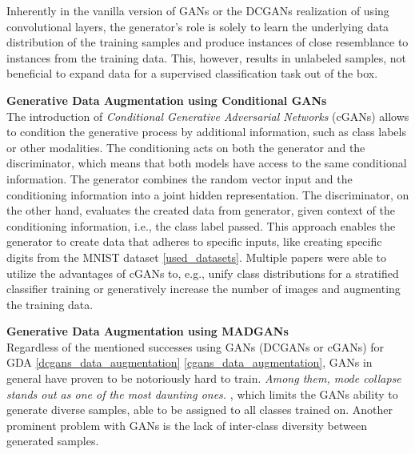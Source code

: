 Inherently in the vanilla version of GANs or the DCGANs realization of using convolutional layers, the generator's role is solely to learn the underlying data distribution of the training samples and produce instances of close resemblance to instances from the training data. This, however, results in unlabeled samples, not beneficial to expand data for a supervised classification task out of the box.

\noindent\textbf{Generative Data Augmentation using Conditional GANs}\label{cgans_data_augmentation} \\
The introduction of \textit{Conditional Generative Adversarial Networks} (cGANs) \cite{mirza2014conditionalgenerativeadversarialnets} allows to condition the generative process by additional information, such as class labels or other modalities. The conditioning acts on both the generator and the discriminator, which means that both models have access to the same conditional information. The generator combines the random vector input and the conditioning information into a joint hidden representation. The discriminator, on the other hand, evaluates the created data from generator, given context of the conditioning information, i.e., the class label passed. This approach enables the generator to create data that adheres to specific inputs, like creating specific digits from the MNIST dataset \ref{used_datasets}. Multiple papers were able to utilize the advantages of cGANs to, e.g., unify class distributions for a stratified classifier training or generatively increase the number of images and augmenting the training data\cite{jeong2022gan}\cite{zhao2023gan}\cite{cGANGDA2025asurveyreview}\cite{wickramaratne2021conditional}.

\noindent\textbf{Generative Data Augmentation using MADGANs}\label{madgans_data_augmentation} \\
Regardless of the mentioned successes using GANs (DCGANs or cGANs) for GDA \ref{dcgans_data_augmentation} \ref{cgans_data_augmentation}, GANs in general have proven to be notoriously hard to train. \textit{Among them, mode collapse stands out as one of the most daunting ones.} \cite{durall2020combatingmodecollapsegan}, which limits the GANs ability to generate diverse samples, able to be assigned to all classes trained on. Another prominent problem with GANs is the lack of inter-class diversity between generated samples.

